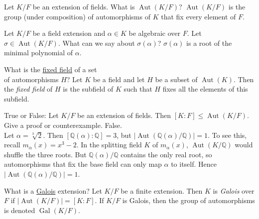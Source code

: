 \documentclass[avery5371,grid]{flashcards}
\newcommand{\Q}{\mathbb{Q}}
\DeclareMathOperator{\Aut}{Aut}
\DeclareMathOperator{\Gal}{Gal}
\begin{document}
\begin{flashcard}[Fields]{Let $K/F$ be an extension of fields. What is $\Aut(K/F)$?}
 $\Aut(K/F)$ is the group (under composition) of automorphisms of $K$ that fix every element of $F$.
\end{flashcard}

\begin{flashcard}[Fields]{Let $K/F$ be a field extension and $\alpha \in K$ be algebraic over $F$. Let $\sigma \in \Aut(K/F)$. What can we say about $\sigma(\alpha)$?}
 $\sigma(\alpha)$ is a root of the minimal polynomial of $\alpha$.
\end{flashcard}

\begin{flashcard}[Fields]{What is the \underline{fixed field} of a set \\of automorphisms $H$?}
 Let $K$ be a field and let $H$ be a subset of $\Aut(K)$. Then the \emph{fixed field} of $H$ is the subfield of $K$ such that $H$ fixes all the elements of this subfield.
\end{flashcard}

\begin{flashcard}[Fields]{True or False: Let $K/F$ be an extension of fields. Then $[K:F] \leq \Aut(K/F)$. Give a proof or counterexample.}
 False. \\
 
 Let $\alpha = \sqrt[3]{2}$. Then $[\Q(\alpha):\Q]=3$, but $|\Aut(\Q(\alpha)/\Q)|=1$. To see this, recall $m_{\alpha}(x) = x^3 - 2$. In the splitting field $K$ of $m_{\alpha}(x)$, $\Aut(K/\Q)$ would shuffle the three roots. But $\Q(\alpha)/\Q$ contains the only real root, so automorphisms that fix the base field can only map $\alpha$ to itself. Hence $|\Aut(\Q(\alpha)/\Q)| = 1$.
\end{flashcard}

\begin{flashcard}[Fields]{What is a \underline{Galois} extension?}
 Let $K/F$ be a finite extension. Then $K$ is \emph{Galois} over $F$ if $|\Aut(K/F)| = [K:F]$. If $K/F$ is Galois, then the group of automorphisms is denoted $\Gal(K/F)$.
\end{flashcard}
\end{document}

